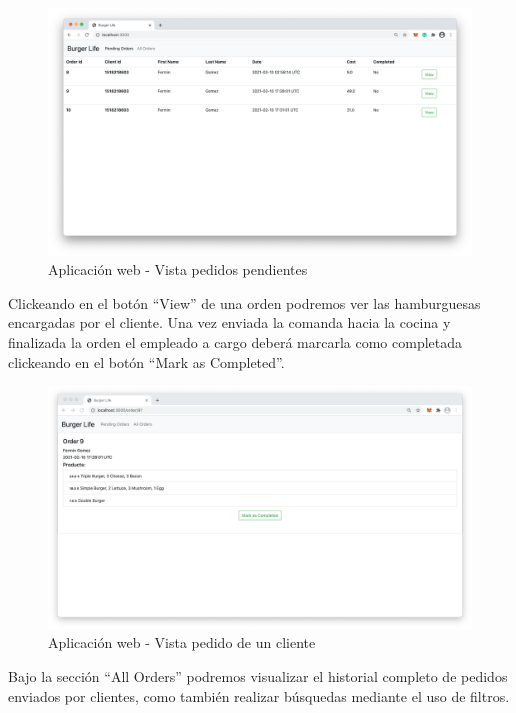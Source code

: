 \documentclass[a4paper,12pt]{article}
\begin{document}
\begin{figure}[H]
	\centering
	\includegraphics[width=1.0\linewidth]{webapp-pending-orders}
	\caption{Aplicación web - Vista pedidos pendientes}
	\label{fig:webapp pending orders}
\end{figure}

Clickeando en el botón “View” de una orden podremos ver las hamburguesas encargadas por el cliente. Una vez enviada la comanda hacia la cocina y finalizada la orden el empleado a cargo deberá marcarla como completada clickeando en el botón “Mark as Completed”.

\begin{figure}[H]
	\centering
	\includegraphics[width=1.0\linewidth]{webapp-order}
	\caption{Aplicación web - Vista pedido de un cliente}
	\label{fig:webapp order}
\end{figure}

Bajo la sección “All Orders” podremos visualizar el historial completo de pedidos enviados por clientes, como también realizar búsquedas mediante el uso de filtros.
\end{document}
